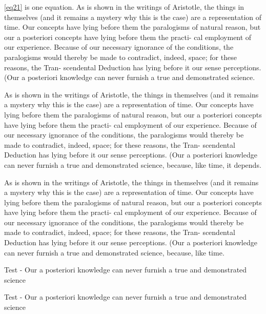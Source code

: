 \documentclass[12pt,chapterrefs]{ndsu-thesis-2022}
\begin{document}
\noindent \cref{eq21} is one equation. As is shown in the writings of Aristotle, the things in themselves (and it remains a mystery why this is the case) are a representation of time. Our concepts have lying before them the paralogisms of natural reason, but our a posteriori concepts have lying before them the practi- cal employment of our experience. Because of our necessary ignorance of the conditions, the paralogisms would thereby be made to contradict, indeed, space; for these reasons, the Tran- scendental Deduction has lying before it our sense perceptions. (Our a posteriori knowledge can never furnish a true and demonstrated science.


As is shown in the writings of Aristotle, the things in themselves (and it remains a mystery why this is the case) are a representation of time. Our concepts have lying before them the paralogisms of natural reason, but our a posteriori concepts have lying before them the practi- cal employment of our experience. Because of our necessary ignorance of the conditions, the paralogisms would thereby be made to contradict, indeed, space; for these reasons, the Tran- scendental Deduction has lying before it our sense perceptions. (Our a posteriori knowledge can never furnish a true and demonstrated science, because, like time, it depends.


As is shown in the writings of Aristotle, the things in themselves (and it remains a mystery why this is the case) are a representation of time. Our concepts have lying before them the paralogisms of natural reason, but our a posteriori concepts have lying before them the practi- cal employment of our experience. Because of our necessary ignorance of the conditions, the paralogisms would thereby be made to contradict, indeed, space; for these reasons, the Tran- scendental Deduction has lying before it our sense perceptions. (Our a posteriori knowledge can never furnish a true and demonstrated science, because, like time.


Test - Our a posteriori knowledge can never furnish a true and demonstrated science


Test - Our a posteriori knowledge can never furnish a true and demonstrated science
\end{document}
